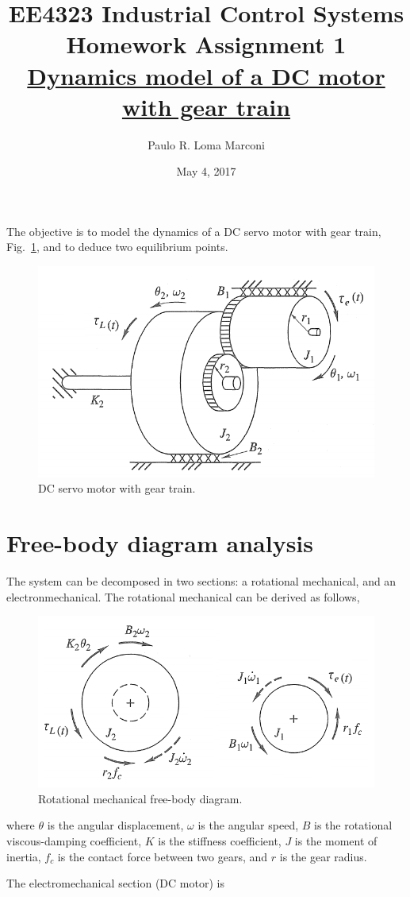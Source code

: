 \documentclass[]{article}
\title{EE4323 Industrial Control Systems\\ 
		Homework Assignment 1\\
		\underline{Dynamics model of a DC motor with gear train}}
\author{Paulo R. Loma Marconi}
\date{May 4, 2017}
\newcommand{\figref}[1]{Fig.~\ref{#1}}
\begin{document}
\maketitle

The objective is to model the dynamics of a DC servo motor with gear train, \figref{fig:DCmotor}, and to deduce two equilibrium points.

\begin{figure}[!ht]
	\centering
	\includegraphics[width=0.5\linewidth]{DCmotor}
	\caption{DC servo motor with gear train.}
	\label{fig:DCmotor}
\end{figure}

\section{Free-body diagram analysis}
The system can be decomposed in two sections: a rotational mechanical, and an electronmechanical. The rotational mechanical can be derived as follows,

\begin{figure}[H]
	\centering
	\includegraphics[width=0.5\linewidth]{Rotational_free-body}
	\caption{Rotational mechanical free-body diagram.}
	\label{fig:rotational_free-body}
\end{figure}
where $\theta$ is the angular displacement, $\omega$ is the angular speed, $B$ is the rotational viscous-damping coefficient, $K$ is the stiffness coefficient, $J$ is the moment of inertia, $f_c$ is the contact force between two gears, and $r$ is the gear radius.

The electromechanical section (DC motor) is
\end{document}
